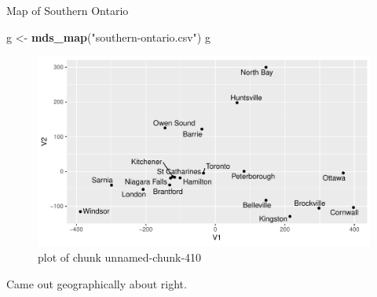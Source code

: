 \documentclass[ignorenonframetext,]{beamer}
\newenvironment{Shaded}{\begin{snugshade}}{\end{snugshade}}
\newcommand{\KeywordTok}[1]{\textcolor[rgb]{0.13,0.29,0.53}{\textbf{#1}}}
\newcommand{\NormalTok}[1]{#1}
\newcommand{\StringTok}[1]{\textcolor[rgb]{0.31,0.60,0.02}{#1}}
\begin{document}
\begin{frame}[fragile]{Map of Southern Ontario}
\protect\hypertarget{map-of-southern-ontario}{}

\begin{Shaded}
\begin{Highlighting}[]
\NormalTok{g <-}\StringTok{ }\KeywordTok{mds_map}\NormalTok{(}\StringTok{"southern-ontario.csv"}\NormalTok{)}
\NormalTok{g}
\end{Highlighting}
\end{Shaded}

\begin{figure}
\centering
\includegraphics{figure/unnamed-chunk-410-1.pdf}
\caption{plot of chunk unnamed-chunk-410}
\end{figure}

Came out geographically about right.

\end{frame}
\end{document}

